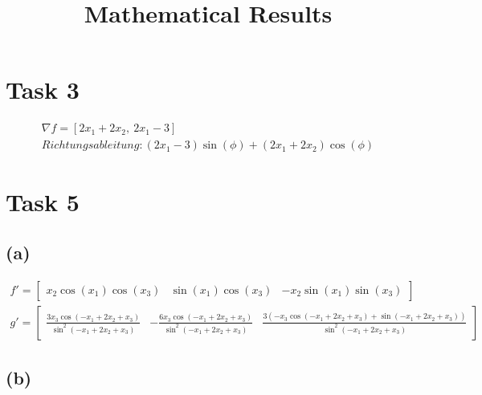 \documentclass{article}
\title{Mathematical Results}
\author{}
\date{}
\begin{document}
\maketitle

\section*{Task 3}

\begin{align*}
    \nabla f = \left[ 2 x_{1} + 2 x_{2}, \  2 x_{1} - 3\right] \\
    Richtungsableitung: \left(2 x_{1} - 3\right) \sin{\left(\phi \right)} + \left(2 x_{1} + 2 x_{2}\right) \cos{\left(\phi \right)}
\end{align*}

\section*{Task 5}

\subsection*{(a)}

\begin{align*}
    f' = \left[\begin{matrix}x_{2} \cos{\left(x_{1} \right)} \cos{\left(x_{3} \right)} & \sin{\left(x_{1} \right)} \cos{\left(x_{3} \right)} & - x_{2} \sin{\left(x_{1} \right)} \sin{\left(x_{3} \right)}\end{matrix}\right] \\
    g' = \left[\begin{matrix}\frac{3 x_{3} \cos{\left(- x_{1} + 2 x_{2} + x_{3} \right)}}{\sin^{2}{\left(- x_{1} + 2 x_{2} + x_{3} \right)}} & - \frac{6 x_{3} \cos{\left(- x_{1} + 2 x_{2} + x_{3} \right)}}{\sin^{2}{\left(- x_{1} + 2 x_{2} + x_{3} \right)}} & \frac{3 \left(- x_{3} \cos{\left(- x_{1} + 2 x_{2} + x_{3} \right)} + \sin{\left(- x_{1} + 2 x_{2} + x_{3} \right)}\right)}{\sin^{2}{\left(- x_{1} + 2 x_{2} + x_{3} \right)}}\end{matrix}\right]
\end{align*}

\subsection*{(b)}
\end{document}
